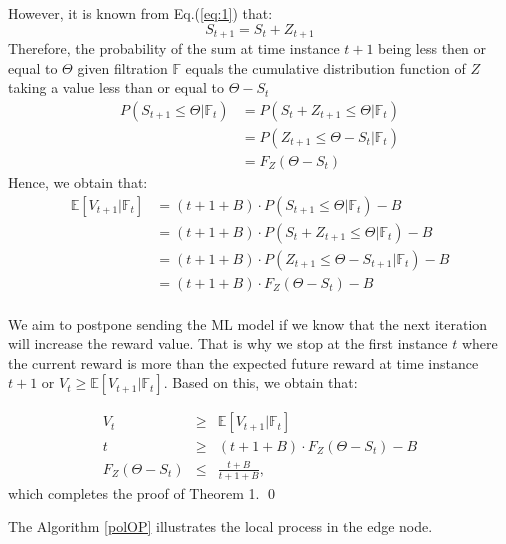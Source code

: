 \documentclass{mpaper}
\begin{document}
However, it is known from Eq.(\ref{eq:1}) that:
\begin{equation}
    S_{t+1} = S_t + Z_{t+1}
\end{equation}
Therefore, the probability of the sum at time instance $t+1$ being less then or equal to $\Theta$ given filtration $\mathbb{F}$ equals the cumulative distribution function of $Z$ taking a value less than or equal to $\Theta - S_t$ 
\begin{align*}
    P(S_{t+1} \leq \Theta | \mathbb{F}_t) &= P(S_t + Z_{t+1} \leq \Theta| \mathbb{F}_t)\\
                           &= P(Z_{t+1}\leq\Theta-S_t| \mathbb{F}_t)\\
                           &= F_{Z}(\Theta - S_t)
\end{align*}
Hence, we obtain that:
\begin{align*}
    \mathbb{E}[V_{t+1}|\mathbb{F}_{t}] &= (t + 1 + B) \cdot P(S_{t+1} \leq \Theta | \mathbb{F}_t) - B\\
    &=(t + 1 + B) \cdot P(S_{t}+Z_{t+1} \leq \Theta | \mathbb{F}_{t}) - B\\
    &=(t + 1 + B) \cdot P(Z_{t+1} \leq \Theta-S_{t+1} | \mathbb{F}_{t}) - B\\
    &=(t + 1 + B) \cdot F_{Z}(\Theta-S_{t}) - B\\
\end{align*}

We aim to postpone sending the ML model if we know that the next iteration will increase the reward value. That is why we stop at the first instance $t$ where the current reward is more than the expected future reward at time instance $t+1$ or $V_{t} \geq \mathbb{E}[V_{t+1}|\mathbb{F}_{t}]$. Based on this, we obtain that:

\begin{eqnarray}
    V_t & \geq  & \mathbb{E}[V_{t+1}|\mathbb{F}_t] \\
    t & \geq  & (t+1+B)\cdot F_{Z}(\Theta - S_t) - B\\
    F_{Z}(\Theta - S_t) &\leq & \frac{t+B}{t+1+B},
\end{eqnarray}
which completes the proof of Theorem 1. 
\qed

The Algorithm \ref{polOP} illustrates the local process in the edge node. 
\end{document}
